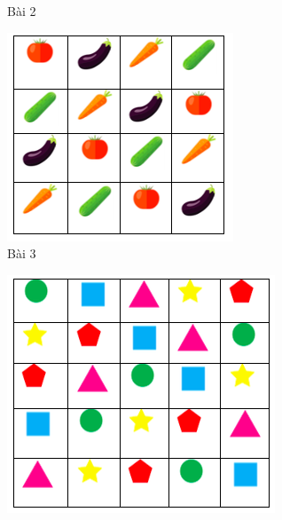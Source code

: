 \begin{multicols}{2}
\begin{figure}[H]
		\caption{\small{Bài 2}}
		\vspace*{-10pt}
	\end{figure}
	\begin{figure}[H]
		\centering
		\vspace*{-5pt}
		\captionsetup{labelformat= empty, justification=centering}
		\includegraphics[width=0.9\linewidth]{sudoku3}
		\caption{\small{Bài 3}}
		\vspace*{-10pt}
	\end{figure}
	\begin{figure}[H]
		\centering
		\vspace*{-5pt}
		\captionsetup{labelformat= empty, justification=centering}
		\includegraphics[width=0.9\linewidth]{sudoku4}

\end{figure}
\end{multicols}
